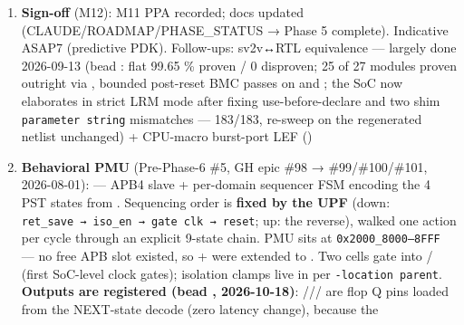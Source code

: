\begin{record}
\begin{enumerate}
{  \warn{} fabric-only, excludes both hard macros / 520×520 µm / 65.6 \%
  util / 0 DRC / 0 antenna \warn{} unsupported, see bead }
  (run 14). PDN \warn{} withdrawn --- every ASAP7 run committed ZERO
  power-grid shapes (bead ); the "benign tap-cell artifact"
  reading was wrong. \warn{} Timing/\allowbreak{}power also unvalidated
  post- (STA zero-wire, run 14 artifacts wiped) --- see
  \cref{cr:run:phase5} §"Power figure caveat" bead
   note. \ok{} Current RTL HAS been re-measured on the fixed
  flow (bead , 2026-09-18): −727.37 ps / 781 violators / hold
  clean / 283.6 mW at ; run
  14\textquotesingle s own figures stay unvalidated.
  \cref{cr:run:phase5}
\item
  \ok{} \textbf{Sign-off} (M12): M11 PPA recorded; docs updated
  (CLAUDE/\allowbreak{}ROADMAP/\allowbreak{}PHASE\_\allowbreak{}STATUS →
  Phase 5 complete). Indicative ASAP7 (predictive PDK). Follow-ups:
  sv2v↔RTL equivalence --- largely done 2026-09-13 (bead :
  flat  99.65 \% proven / 0 disproven; 25 of 27 modules
  proven outright via , bounded
  post-reset BMC passes on  and ; the SoC now
  elaborates in strict LRM mode after fixing 
  use-before-declare and two  shim
  \texttt{parameter\ string} mismatches ---  183/183,
  re-sweep on the regenerated netlist unchanged) + CPU-macro burst-port
  LEF ()
\item
  \ok{} \textbf{Behavioral PMU} (Pre-Phase-6 \#5, GH epic \#98 →
  \#99/\allowbreak{}\#100/\allowbreak{}\#101, 2026-08-01):
   --- APB4 slave + per-domain sequencer FSM
  encoding the 4 PST states from . Sequencing order
  is \textbf{fixed by the UPF} (down:
  \texttt{ret\_\allowbreak{}save\ →\ iso\_\allowbreak{}en\ →\ gate\ clk\ →\ reset};
  up: the reverse), walked one action per cycle through an explicit
  9-state chain. PMU sits at \texttt{0x2000\_\allowbreak{}8000–8FFF} ---
  no free APB slot existed, so  +
   were extended to . Two
   cells gate  into
  / (first SoC-level clock gates); isolation
  clamps live in  per
  \texttt{-\allowbreak{}location\ parent}. \textbf{Outputs are
  registered (bead , 2026-10-18)}:
  /// are flop Q pins
  loaded from the NEXT-state decode (zero latency change), because the

\end{enumerate}
\end{record}

